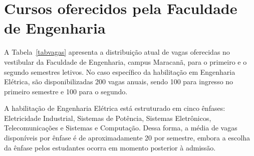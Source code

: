 \section{Cursos oferecidos pela Faculdade de Engenharia}

A Tabela~\ref{tabvagas} apresenta a distribuição atual de vagas oferecidas no vestibular da Faculdade de Engenharia, campus Maracanã, para o primeiro e o segundo semestres letivos. No caso específico da habilitação em Engenharia Elétrica, são disponibilizadas 200 vagas anuais, sendo 100 para ingresso no primeiro semestre e 100 para o segundo.

A habilitação de Engenharia Elétrica está estruturado em cinco ênfases: Eletricidade Industrial, Sistemas de Potência, Sistemas Eletrônicos, Telecomunicações e Sistemas e Computação. Dessa forma, a média de vagas disponíveis por ênfase é de aproximadamente 20 por semestre, embora a escolha da ênfase pelos estudantes ocorra em momento posterior à admissão.


